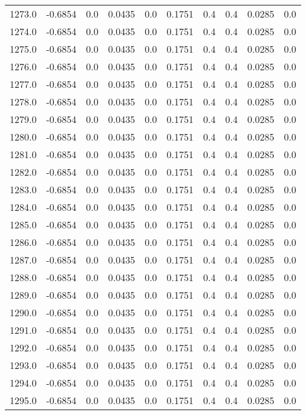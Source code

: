 \begin{longtable}{lrrrrrrrrr}
1273.0 & -0.6854 & 0.0 & 0.0435 & 0.0 & 0.1751 & 0.4 & 0.4 & 0.0285 & 0.0 \\
1274.0 & -0.6854 & 0.0 & 0.0435 & 0.0 & 0.1751 & 0.4 & 0.4 & 0.0285 & 0.0 \\
1275.0 & -0.6854 & 0.0 & 0.0435 & 0.0 & 0.1751 & 0.4 & 0.4 & 0.0285 & 0.0 \\
1276.0 & -0.6854 & 0.0 & 0.0435 & 0.0 & 0.1751 & 0.4 & 0.4 & 0.0285 & 0.0 \\
1277.0 & -0.6854 & 0.0 & 0.0435 & 0.0 & 0.1751 & 0.4 & 0.4 & 0.0285 & 0.0 \\
1278.0 & -0.6854 & 0.0 & 0.0435 & 0.0 & 0.1751 & 0.4 & 0.4 & 0.0285 & 0.0 \\
1279.0 & -0.6854 & 0.0 & 0.0435 & 0.0 & 0.1751 & 0.4 & 0.4 & 0.0285 & 0.0 \\
1280.0 & -0.6854 & 0.0 & 0.0435 & 0.0 & 0.1751 & 0.4 & 0.4 & 0.0285 & 0.0 \\
1281.0 & -0.6854 & 0.0 & 0.0435 & 0.0 & 0.1751 & 0.4 & 0.4 & 0.0285 & 0.0 \\
1282.0 & -0.6854 & 0.0 & 0.0435 & 0.0 & 0.1751 & 0.4 & 0.4 & 0.0285 & 0.0 \\
1283.0 & -0.6854 & 0.0 & 0.0435 & 0.0 & 0.1751 & 0.4 & 0.4 & 0.0285 & 0.0 \\
1284.0 & -0.6854 & 0.0 & 0.0435 & 0.0 & 0.1751 & 0.4 & 0.4 & 0.0285 & 0.0 \\
1285.0 & -0.6854 & 0.0 & 0.0435 & 0.0 & 0.1751 & 0.4 & 0.4 & 0.0285 & 0.0 \\
1286.0 & -0.6854 & 0.0 & 0.0435 & 0.0 & 0.1751 & 0.4 & 0.4 & 0.0285 & 0.0 \\
1287.0 & -0.6854 & 0.0 & 0.0435 & 0.0 & 0.1751 & 0.4 & 0.4 & 0.0285 & 0.0 \\
1288.0 & -0.6854 & 0.0 & 0.0435 & 0.0 & 0.1751 & 0.4 & 0.4 & 0.0285 & 0.0 \\
1289.0 & -0.6854 & 0.0 & 0.0435 & 0.0 & 0.1751 & 0.4 & 0.4 & 0.0285 & 0.0 \\
1290.0 & -0.6854 & 0.0 & 0.0435 & 0.0 & 0.1751 & 0.4 & 0.4 & 0.0285 & 0.0 \\
1291.0 & -0.6854 & 0.0 & 0.0435 & 0.0 & 0.1751 & 0.4 & 0.4 & 0.0285 & 0.0 \\
1292.0 & -0.6854 & 0.0 & 0.0435 & 0.0 & 0.1751 & 0.4 & 0.4 & 0.0285 & 0.0 \\
1293.0 & -0.6854 & 0.0 & 0.0435 & 0.0 & 0.1751 & 0.4 & 0.4 & 0.0285 & 0.0 \\
1294.0 & -0.6854 & 0.0 & 0.0435 & 0.0 & 0.1751 & 0.4 & 0.4 & 0.0285 & 0.0 \\
1295.0 & -0.6854 & 0.0 & 0.0435 & 0.0 & 0.1751 & 0.4 & 0.4 & 0.0285 & 0.0 \\

\end{longtable}
